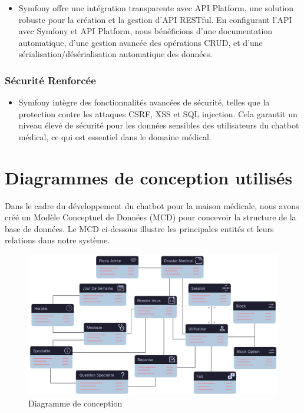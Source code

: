 \begin{itemize}
  \item Symfony offre une intégration transparente avec API Platform, une solution robuste pour la création et la gestion d'API RESTful. En configurant l'API avec Symfony et API Platform, nous bénéficions d'une documentation automatique, d'une gestion avancée des opérations CRUD, et d'une sérialisation/désérialisation automatique des données.
\end{itemize}

\subsubsection{Sécurité Renforcée}

\begin{itemize}
  \item Symfony intègre des fonctionnalités avancées de sécurité, telles que la protection contre les attaques CSRF, XSS et SQL injection. Cela garantit un niveau élevé de sécurité pour les données sensibles des utilisateurs du chatbot médical, ce qui est essentiel dans le domaine médical.
\end{itemize}


\section{Diagrammes de conception utilisés}

\hspace{16pt}Dans le cadre du développement du chatbot pour la maison médicale, nous avons créé un Modèle Conceptuel de Données (MCD) pour concevoir la structure de la base de données. Le MCD ci-dessous illustre les principales entités et leurs relations dans notre système.\\


\begin{figure}[H] 
    \centering
    \includegraphics[scale=0.67]{Figures/MCD.png}
    \caption{Diagramme de conception}
    \label{entite} %
\end{figure}

